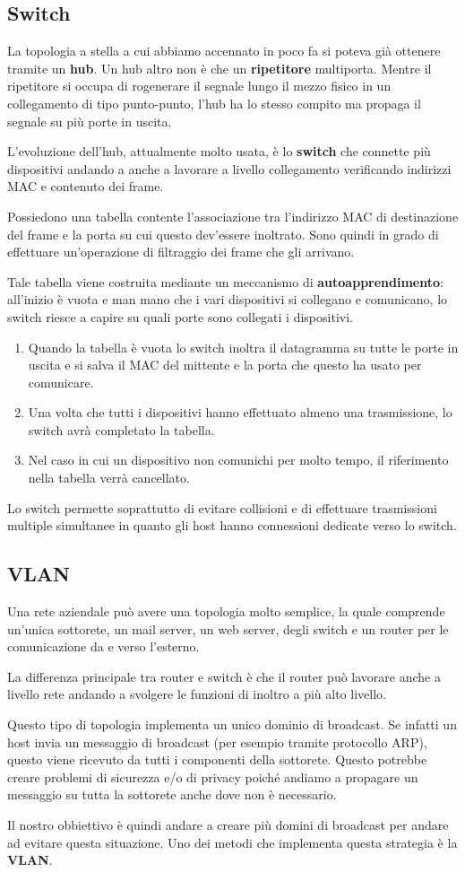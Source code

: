 \subsection{Switch}
La topologia a stella a cui abbiamo accennato in poco fa si poteva
già ottenere tramite un \textbf{hub}. Un hub altro non è che un 
\textbf{ripetitore} multiporta. Mentre il ripetitore si occupa di 
rogenerare il segnale lungo il mezzo fisico in un collegamento di tipo
punto-punto, l'hub ha lo stesso compito ma propaga il segnale su più
porte in uscita.

L'evoluzione dell'hub, attualmente molto usata, è lo \textbf{switch}
che connette più dispositivi andando a anche a lavorare a livello 
collegamento verificando indirizzi MAC e contenuto dei frame.

Possiedono una tabella contente l'associazione tra l'indirizzo MAC di
destinazione del frame e la porta su cui questo dev'essere inoltrato.
Sono quindi in grado di effettuare un'operazione di filtraggio dei 
frame che gli arrivano.

Tale tabella viene costruita mediante un meccanismo di 
\textbf{autoapprendimento}: all'inizio è vuota e man mano che i vari
dispositivi si collegano e comunicano, lo switch riesce a capire su
quali porte sono collegati i dispositivi.
\begin{enumerate}
	\item Quando la tabella è vuota lo switch inoltra il datagramma su
		tutte le porte in uscita e si salva il MAC del mittente e la
		porta che questo ha usato per comunicare.
	\item Una volta che tutti i dispositivi hanno effettuato almeno
		una trasmissione, lo switch avrà completato la tabella.
	\item Nel caso in cui un dispositivo non comunichi per molto 
		tempo, il riferimento nella tabella verrà cancellato.
\end{enumerate}
Lo switch permette soprattutto di evitare collisioni e di effettuare
trasmissioni multiple simultanee in quanto gli host hanno connessioni
dedicate verso lo switch.

\subsection{VLAN}
Una rete aziendale può avere una topologia molto semplice, la quale 
comprende un'unica sottorete, un mail server, un web server, degli 
switch e un router per le comunicazione da e verso l'esterno.

La differenza principale tra router e switch è che il router può 
lavorare anche a livello rete andando a svolgere le funzioni di inoltro
a più alto livello.

Questo tipo di topologia implementa un unico dominio di broadcast. Se
infatti un host invia un messaggio di broadcast (per esempio tramite 
protocollo ARP), questo viene ricevuto da tutti i componenti della 
sottorete. Questo potrebbe creare problemi di sicurezza e/o di privacy
poiché andiamo a propagare un messaggio su tutta la sottorete anche 
dove non è necessario.

Il nostro obbiettivo è quindi andare a creare più domini di broadcast
per andare ad evitare questa situazione. Uno dei metodi che implementa
questa strategia è la \textbf{VLAN}.
